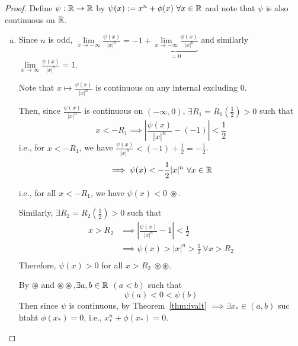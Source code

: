 \begin{proof}
    Define $\psi: \mathbb R \to \mathbb R$ by $\psi(x):= x^n + \phi(x)\ \forall x \in \RR$
    and note that $\psi$ is also continuous on $\mathbb R$.
    \begin{enumerate}[(a)]
        \item Since $n$ is odd, $\lim\limits_{x\to -\infty}\frac{\psi(x)}{|x|^n} = -1 + \underbrace{\lim\limits_{x \to -\infty} \frac{\phi(x)}{|x|^n}}_{=0}$
        and similarly $\lim\limits_{x\to \infty}\frac{\psi(x)}{|x|^n} = 1$.

        Note that $x \mapsto \frac{\psi(x)}{|x|^n}$ is continuous on any internal excluding 0. 

        Then, since $\frac{\psi(x)}{|x|^n}$ is continuous on $(-\infty, 0)$, $\exists R_1 = R_1(\frac{1}{2}) > 0$ such that
        $$x < -R_1 \implies \left|\frac{\psi(x)}{|x|^n} - (-1)\right| < \frac{1}{2}$$
        i.e., for $x < -R_1$, we have $\frac{\psi(x)}{|x|^n} < (-1) + \frac{1}{2} = -\frac{1}{2}$.
        $$\implies \psi(x) < -\frac{1}{2}|x|^n\ \forall x \in \RR$$

        i.e., for all $x < -R_1$, we have $\psi(x) < 0\ \circledast$.

        Similarly, $\exists R_2 = R_2(\frac{1}{2}) > 0$ such that 
        \begin{align*}
            x > R_2 &\implies \left|\frac{\psi(x)}{|x|^n}  - 1\right| < \frac{1}{2} \\
            &\implies \psi(x) > |x|^n > \frac{1}{2}\ \forall x > R_2 \\
        \end{align*}
        Therefore, $\psi(x) > 0$ for all $x > R_2\ \circledast \circledast $.

        By $\circledast$ and $\circledast \circledast$,$\exists a, b \in \mathbb R$ $(a < b)$ such that
        $$\psi(a) < 0 < \psi(b)$$ Then since $\psi$ is continuous, by Theorem~\ref{thm:ivalt}
        $\implies \exists x_* \in (a, b)$ suc htaht $\phi(x_*) = 0$, i.e., $x_*^n + \phi(x_*) = 0$.
    \end{enumerate}
\end{proof}

\begin{example}
    
\end{example}
\begin{example}
    
\end{example}
\begin{example}
    
\end{example}

